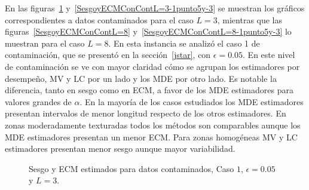 En las figuras~\ref{SesgoyECMConContL=3} y~\ref{SesgoyECMConContL=3-1punto5y-3} se muestran los gráficos correspondientes a datos contaminados para el caso $L=3$, mientras que las figuras~\ref{SesgoyECMConContL=8} y~\ref{SesgoyECMConContL=8-1punto5y-3} lo muestran para el caso $L=8$. En esta instancia se analizó el caso 1 de contaminación, que se presentó en la sección~\ref{jstar}, con $\epsilon=0.05$. En este nivel de contaminación se ve con mayor claridad cómo se agrupan los estimadores por desempeño, MV y LC por un lado y los MDE por otro lado. Es notable la diferencia, tanto en sesgo como en ECM, a favor de los MDE estimadores para valores grandes de $\alpha$. En la mayoría de los casos estudiados los MDE estimadores presentan intervalos de menor longitud respecto de los otros estimadores. En zonas moderadamente texturadas todos los métodos son comparables aunque los MDE estimadores presentan un menor ECM. Para zonas homogéneas MV y LC estimadores presentan menor sesgo aunque mayor variabilidad.

\begin{figure}[H]
	\caption{\label{SesgoyECMConContL=3}\small Sesgo y ECM estimados para datos contaminados, Caso $1$, $\epsilon=0.05$ y $ L=3$.}
\end{figure}

